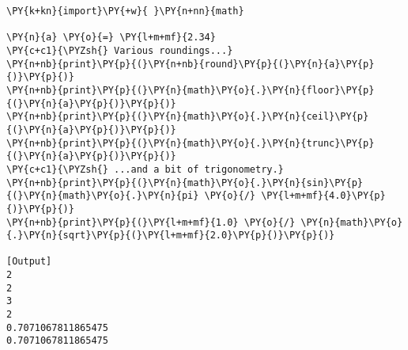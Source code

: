 \begin{Verbatim}[label=\makebox{\href{https://github.com/unipi-physics-labs/lab1-notes/tree/main/snippy/rounding.py}{https://github.com/.../rounding.py}},commandchars=\\\{\}]
\PY{k+kn}{import}\PY{+w}{ }\PY{n+nn}{math}

\PY{n}{a} \PY{o}{=} \PY{l+m+mf}{2.34}
\PY{c+c1}{\PYZsh{} Various roundings...}
\PY{n+nb}{print}\PY{p}{(}\PY{n+nb}{round}\PY{p}{(}\PY{n}{a}\PY{p}{)}\PY{p}{)}
\PY{n+nb}{print}\PY{p}{(}\PY{n}{math}\PY{o}{.}\PY{n}{floor}\PY{p}{(}\PY{n}{a}\PY{p}{)}\PY{p}{)}
\PY{n+nb}{print}\PY{p}{(}\PY{n}{math}\PY{o}{.}\PY{n}{ceil}\PY{p}{(}\PY{n}{a}\PY{p}{)}\PY{p}{)}
\PY{n+nb}{print}\PY{p}{(}\PY{n}{math}\PY{o}{.}\PY{n}{trunc}\PY{p}{(}\PY{n}{a}\PY{p}{)}\PY{p}{)}
\PY{c+c1}{\PYZsh{} ...and a bit of trigonometry.}
\PY{n+nb}{print}\PY{p}{(}\PY{n}{math}\PY{o}{.}\PY{n}{sin}\PY{p}{(}\PY{n}{math}\PY{o}{.}\PY{n}{pi} \PY{o}{/} \PY{l+m+mf}{4.0}\PY{p}{)}\PY{p}{)}
\PY{n+nb}{print}\PY{p}{(}\PY{l+m+mf}{1.0} \PY{o}{/} \PY{n}{math}\PY{o}{.}\PY{n}{sqrt}\PY{p}{(}\PY{l+m+mf}{2.0}\PY{p}{)}\PY{p}{)}

[Output]
2
2
3
2
0.7071067811865475
0.7071067811865475
\end{Verbatim}

